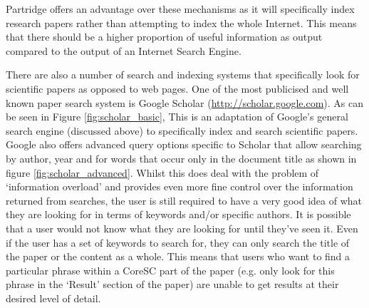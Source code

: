\documentclass[12pt,a4paper]{article}
\begin{document}
Partridge offers an advantage over these mechanisms as it will specifically
index research papers rather than attempting to index the whole Internet.
This means that there should be a higher proportion of useful information as
output compared to the output of an Internet Search Engine.

There are also a number of search and indexing systems that specifically look
for scientific papers as opposed to web pages. One of the most publicised and
well known paper search system is Google Scholar
(\url{http://scholar.google.com}).  As can be seen in Figure
\ref{fig:scholar_basic}, This is an adaptation of Google's general search
engine (discussed above) to specifically index and search scientific papers.
Google also offers advanced query options specific to Scholar that allow
searching by author, year and for words that occur only in the document title
as shown in figure \ref{fig:scholar_advanced}. Whilst this does deal with the
problem of `information overload' and provides even more fine control over the
information returned from searches,  the user is still required to have a very
good idea of what they are looking for in terms of keywords and/or specific
authors. It is possible that a user would not know what they are looking for
until they've seen it. Even if the user has a set of keywords to search for,
they can only search the title of the paper or the content as a whole. This
means that users who want to find a particular phrase within a CoreSC part of
the paper (e.g. only look for this phrase in the `Result' section of the
paper) are unable to get results at their desired level of detail.
\end{document}
